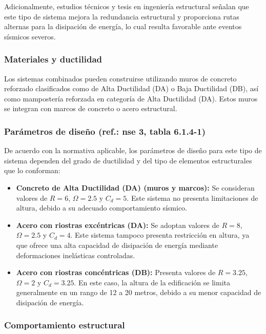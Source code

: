 \documentclass[14pt,letterpaper]{extarticle}
\begin{document}
	
	Adicionalmente, estudios técnicos y tesis en ingeniería estructural señalan que este tipo de sistema mejora la redundancia estructural y proporciona rutas alternas para la disipación de energía, lo cual resulta favorable ante eventos sísmicos severos.
	
	\subsubsection{Materiales y ductilidad}
	
	Los sistemas combinados pueden construirse utilizando muros de concreto reforzado clasificados como de Alta Ductilidad (DA) o Baja Ductilidad (DB), así como mampostería reforzada en categoría de Alta Ductilidad (DA). Estos muros se integran con marcos de concreto o acero estructural.
	

	
	
	\subsubsection{Parámetros de diseño (ref.: nse 3, tabla 6.1.4-1)}
	
	De acuerdo con la normativa aplicable, los parámetros de diseño para este tipo de sistema dependen del grado de ductilidad y del tipo de elementos estructurales que lo conforman:
	
	\begin{itemize}
		\item \textbf{Concreto de Alta Ductilidad (DA) (muros y marcos):} Se consideran valores de $R = 6$, $\Omega = 2.5$ y $C_d = 5$. Este sistema no presenta limitaciones de altura, debido a su adecuado comportamiento sísmico.
		
		\item \textbf{Acero con riostras excéntricas (DA):} Se adoptan valores de $R = 8$, $\Omega = 2.5$ y $C_d = 4$. Este sistema tampoco presenta restricción en altura, ya que ofrece una alta capacidad de disipación de energía mediante deformaciones inelásticas controladas.
		
		\item \textbf{Acero con riostras concéntricas (DB):} Presenta valores de $R = 3.25$, $\Omega = 2$ y $C_d = 3.25$. En este caso, la altura de la edificación se limita generalmente en un rango de 12 a 20 metros, debido a su menor capacidad de disipación de energía.
	\end{itemize}
	
	\subsubsection{Comportamiento estructural}
	
\end{document}
